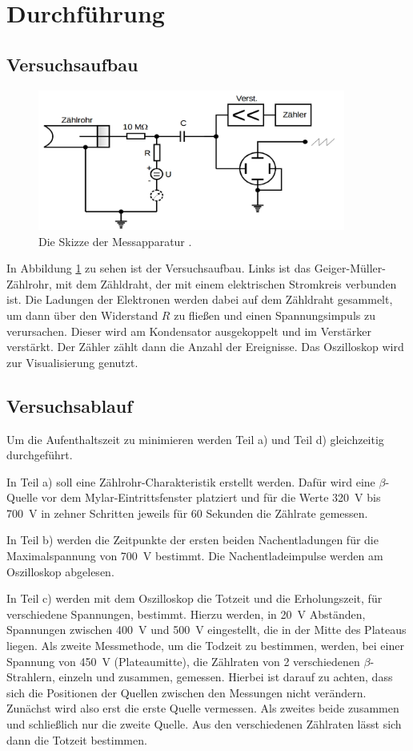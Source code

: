 \documentclass[
  bibliography=totoc,     %
  captions=tableheading,  %
  titlepage=firstiscover, %
]{scrartcl}
\begin{document}
\section{Durchführung}
\subsection{Versuchsaufbau}
\begin{figure}[htb]
  \centering
  \includegraphics[width=0.9\textwidth]{V7035.png}
  \caption{Die Skizze der Messapparatur \cite{anleitung}.}
  \label{fig:V7035}
\end{figure}
In Abbildung \ref{fig:V7035} zu sehen ist der Versuchsaufbau. Links ist das
Geiger-Müller-Zählrohr, mit dem Zähldraht, der mit einem
elektrischen Stromkreis verbunden ist. Die Ladungen der Elektronen werden dabei
auf dem Zähldraht gesammelt, um dann über den Widerstand $R$ zu fließen
und einen Spannungsimpuls zu verursachen. Dieser wird am Kondensator
ausgekoppelt und im Verstärker verstärkt. Der Zähler zählt dann die Anzahl
der Ereignisse. Das Oszilloskop wird zur Visualisierung genutzt.
\subsection{Versuchsablauf}
Um die Aufenthaltszeit zu minimieren werden Teil a) und Teil d) gleichzeitig
durchgeführt.

In Teil a) soll eine Zählrohr-Charakteristik erstellt werden. Dafür wird eine
$\beta$-Quelle vor dem Mylar-Eintrittsfenster platziert und für die Werte
\SI{320}{\volt} bis \SI{700}{\volt} in zehner Schritten jeweils für 60 Sekunden
die Zählrate gemessen.

In Teil b) werden die Zeitpunkte der ersten beiden Nachentladungen für die
Maximalspannung von \SI{700}{\volt} bestimmt. Die Nachentladeimpulse werden am
Oszilloskop abgelesen.

In Teil c) werden mit dem Oszilloskop die Totzeit und die Erholungszeit, für
verschiedene Spannungen, bestimmt. Hierzu werden, in \SI{20}{\volt} Abständen,
Spannungen zwischen \SI{400}{\volt} und \SI{500}{\volt} eingestellt, die in
der Mitte des Plateaus liegen.
Als zweite Messmethode, um die Todzeit zu bestimmen, werden, bei einer Spannung
von \SI{450}{\volt} (Plateaumitte), die Zählraten von 2 verschiedenen $\beta$-Strahlern,
einzeln und zusammen, gemessen. Hierbei ist darauf zu achten, dass sich die Positionen
der Quellen zwischen den Messungen nicht verändern. Zunächst wird also erst die erste
Quelle vermessen. Als zweites beide zusammen und schließlich nur die zweite Quelle.
Aus den verschiedenen Zählraten lässt sich dann die Totzeit bestimmen.
\end{document}
